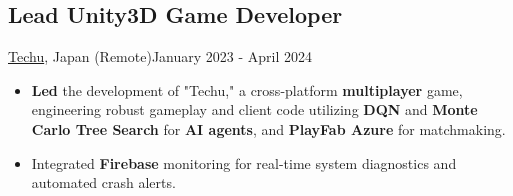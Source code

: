 \subsection{Lead Unity3D Game Developer}{\href{https://techuonthechair.com}{Techu}, Japan (Remote)}{January 2023 - April 2024}
\begin{itemize}
    \item \textbf{Led} the development of "Techu," a cross-platform \textbf{multiplayer} game, engineering robust gameplay and client code utilizing \textbf{DQN} and \textbf{Monte Carlo Tree Search} for \textbf{AI agents}, and \textbf{PlayFab Azure} for matchmaking.
    \item Integrated \textbf{Firebase} monitoring for real-time system diagnostics and automated crash alerts.
\end{itemize}
